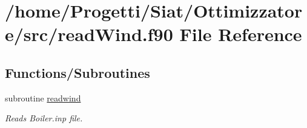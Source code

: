 \hypertarget{read_wind_8f90}{\section{/home/\-Progetti/\-Siat/\-Ottimizzatore/src/read\-Wind.f90 File Reference}
\label{read_wind_8f90}
}
\subsection*{Functions/\-Subroutines}
\begin{DoxyCompactItemize}
\item 
subroutine \hyperlink{read_wind_8f90_a56b52d565348f1a4a11f1b82dcc9efb9}{readwind}
\begin{DoxyCompactList}\small\item\em Reads Boiler.\-inp file. \end{DoxyCompactList}\end{DoxyCompactItemize}


